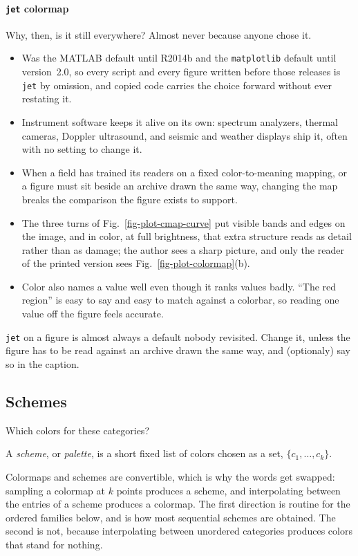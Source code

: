 \paragraph{\texttt{jet} colormap}
Why, then, is it still everywhere? Almost never because anyone chose it. 
\begin{itemize}
	\item Was the MATLAB default until R2014b and the \texttt{matplotlib} default until version~2.0, so every script and every figure written before those releases is \texttt{jet} by omission, and copied code carries the choice forward without ever restating it.
	\item Instrument software keeps it alive on its own: spectrum analyzers, thermal cameras, Doppler ultrasound, and seismic and weather displays ship it, often with no setting to change it.
	\item When a field has trained its readers on a fixed color-to-meaning mapping, or a figure must sit beside an archive drawn the same way, changing the map breaks the comparison the figure exists to support.
	\item The three turns of Fig.~\ref{fig-plot-cmap-curve} put visible bands and edges on the image, and in color, at full brightness, that extra structure reads as detail rather than as damage; the author sees a sharp picture, and only the reader of the printed version sees Fig.~\ref{fig-plot-colormap}(b).
	\item Color also names a value well even though it ranks values badly. ``The red region'' is easy to say and easy to match against a colorbar, so reading one value off the figure feels accurate.
\end{itemize}

\begin{box_blue}
	\texttt{jet} on a figure is almost always a default nobody revisited. Change it, unless the figure has to be read against an archive drawn the same way, and (optionaly) say so in the caption.
\end{box_blue}
\FloatBarrier

\subsection{Schemes}\label{sec-app-plot-colormap-scheme}
\begin{goal}
Which colors for these categories?
\end{goal}
\begin{box_blue}[Scheme]
	A \emph{scheme}, or \emph{palette}, is a short fixed list of colors chosen as a set, $\{c_1,\dots,c_k\}$. 
\end{box_blue}
Colormaps and schemes are convertible, which is why the words get swapped: sampling a colormap at $k$ points produces a scheme, and interpolating between the entries of a scheme produces a colormap. The first direction is routine for the ordered families below, and is how most sequential schemes are obtained. The second is not, because interpolating between unordered categories produces colors that stand for nothing.


